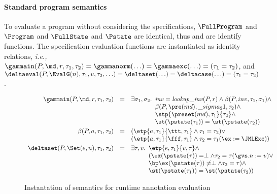 \paragraph{Standard program semantics}
To evaluate a program without considering the specifications, 
\(\FullProgram\) and \(\Program\) and
\(\FullState\) and \(\Pstate\) are identical, thus \program and
\progstate are identify functions. The specification evaluation
functions are instantiated as identity relations, \emph{i.e.,}
\(\gammain(P, \md, r, \tau_1, \tau_2) = \gammanorm(\ldots) =
\gammaexc(\ldots) = (\tau_1 = \tau_2)\), and \(\deltaeval(P,
\EvalG(n), \tau_1, v, \tau_2, \ldots) = \deltaset(\ldots) = \deltacase(\ldots) = (\tau_1 =
\tau_2)\).  

\begin{figure}[t]
\[
\begin{array}{rcl}
\gammain(P, \md, r, \tau_1, \tau_2) & = & 
\exists \sigma_1, \sigma_2.
\begin{array}[t]{l}
\mathit{inv} = \mathit{lookup\_inv}(P, r) \wedge 
\beta(P, inv, \tau_1, \sigma_1) \wedge \\
\beta(P, \pre(md), \_sigma_21, \tau_2) \wedge\\
\stp{\preset(md), \tau_1}{\tau_2} \wedge\\
\st(\pstate(\tau_1)) = \st(\pstate(\tau_2))
\end{array}
\smallskip\\

\beta(P, a, \tau_1, \tau_2) & = & 
(\etp{a, \tau_1}{\ttt, \tau_1} \wedge \tau_1 = \tau_2) \vee\\
&& (\etp{a, \tau_1}{\fff, \tau_1} \wedge \tau_2 = \tau_1(\ex := \JMLExc))
\smallskip\\

\deltaset(P, \Set(e, n), \tau_1, \tau_2) & = & 
\exists \tau, v. 
\begin{array}[t]{l}
\etp{e, \tau_1}{v, \tau} \wedge\\
(\ex(\pstate(\tau)) = \perp \wedge \tau_2 = \tau (\gvs.n := v) \vee\\
\bp \ex(\pstate(\tau)) \not= \perp \wedge \tau_2 = \tau) \wedge\\
\st(\pstate(\tau_1)) = \st(\pstate(\tau_2))
\end{array}
\\
\end{array}
\]
\caption{Instantation of semantics for runtime annotation evaluation}
\label{FigAnnotatedSem}
\end{figure}

